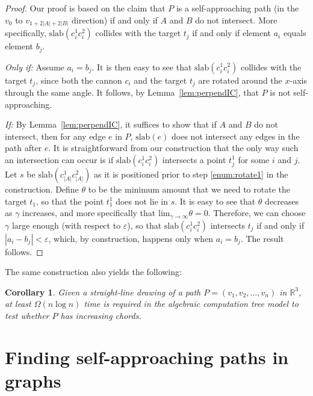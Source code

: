 \documentclass[11pt]{article}
\newcommand{\perpslab}[1]{\mathrm{slab}(#1)}
\newtheorem{corollary}[theorem]{Corollary}
\newcommand{\ignore}[1]{}
\newcommand{\changedagain}[1]{{#1}}
\begin{document}
\begin{proof}
\changedagain{Our proof is based on the claim that $P$ is} a self-approaching path (in the $v_0$ to $v_{1+2|A|+2|B|}$ direction) if and only if $A$ and $B$ do not intersect. More specifically, $\perpslab{c_i^1c_i^2}$ collides with the target $t_j$ if and only if element $a_i$ equals element $b_j$.

\emph{Only if:} Assume $a_i=b_j$.  It is then easy to see that $\perpslab{c_i^1c_i^2}$ collides with the target $t_j$, since both the cannon $c_i$ and the target $t_j$ are rotated around the $x$-axis through the same angle.  It follows, by Lemma~\ref{lem:perpendIC}, that $P$ is not self-approaching.

\emph{If:} By Lemma~\ref{lem:perpendIC}, it suffices to show that if $A$ and $B$ do not intersect, then for any edge $e$ in $P$, $\perpslab{e}$ does not intersect any edges in the path after $e$. It is straightforward from our construction that the only way such an intersection can occur is if $\perpslab{c_i^1c_i^2}$ intersects a point $t_j^1$ for some $i$ and $j$.  Let $s$ be $\perpslab{c_{|A|}^1c_{|A|}^2}$ as it is positioned prior to step \ref{enum:rotate1} in the construction.
Define $\theta$ to be the minimum amount that we need to rotate the target $t_1$, so that the point $t_1^1$ does not lie in $s$. It is easy to see that $\theta$ decreases as $\gamma$ increases, and more specifically that $\mathrm{lim}_{\gamma\rightarrow \infty} \theta = 0$. Therefore, we can choose $\gamma$ large enough (with respect to $\varepsilon$), so that $\perpslab{c_i^1c_i^2}$ intersects $t_j$ if and only if $|a_i-b_j| < \varepsilon$, which, by construction, happens only when $a_i=b_j$.  The result follows.
\end{proof}

\ignore{To prove this, we build an embedding of a path in $\mathbb{R}^3$ using `cannons' and `targets', where a slab perpendicular to a `cannon' collides with a `target' if and only if the corresponding elements of the sets $A$ and $B$ are identical.}

The same construction also yields the following:
\begin{corollary}
Given a straight-line drawing of a path $P=(v_1,v_2,\ldots,v_n)$ in $\mathbb{R}^3$, at least $\Omega(n\log n)$ time is required in the algebraic computation tree model to test whether $P$ has increasing chords.
\end{corollary}





\section{Finding self-approaching paths in graphs}
\label{sec:SAPathsInGraphs}
\end{document}
